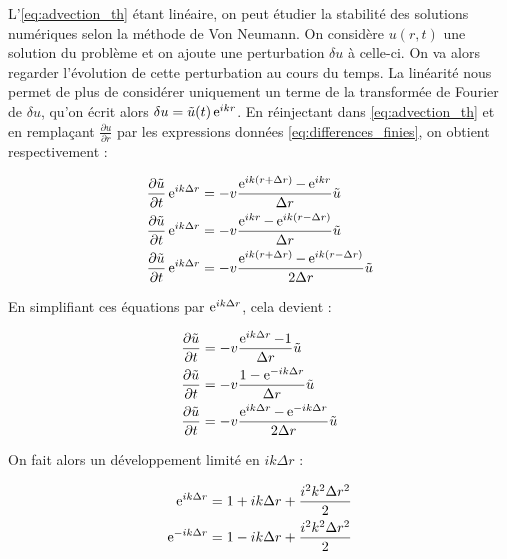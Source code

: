 L’\cref{eq:advection_th} étant linéaire, on peut étudier la stabilité des
solutions numériques selon la méthode de Von Neumann. On considère $u(r,t)$ une
solution du problème et on ajoute une perturbation $\delta{u}$ à celle-ci. On
va alors regarder l’évolution de cette perturbation au cours du temps. La
linéarité nous permet de plus de considérer uniquement un terme de la
transformée de Fourier de $\delta{u}$, qu’on écrit alors $\delta{u} =
\tilde{u}(t) \operatorname{e}^{ikr}$. En réinjectant dans \eqref{eq:advection_th} et en
remplaçant $\frac{\partial u}{\partial r}$ par les expressions données
\cref{eq:differences_finies}, on obtient respectivement :

\begin{subequations}
    \begin{align}
        \frac{\partial \tilde{u}}{\partial t} \operatorname{e}^{ik\Delta{r}} &= - v \frac{\operatorname{e}^{ik(r+\Delta{r})} - \operatorname{e}^{ik r           }}{  \Delta{r}} \tilde{u}\\
        \frac{\partial \tilde{u}}{\partial t} \operatorname{e}^{ik\Delta{r}} &= - v \frac{\operatorname{e}^{ik r           } - \operatorname{e}^{ik(r-\Delta{r})}}{  \Delta{r}} \tilde{u}\\
        \frac{\partial \tilde{u}}{\partial t} \operatorname{e}^{ik\Delta{r}} &= - v \frac{\operatorname{e}^{ik(r+\Delta{r})} - \operatorname{e}^{ik(r-\Delta{r})}}{2 \Delta{r}} \tilde{u}
    \end{align}
\end{subequations}

En simplifiant ces équations par $\operatorname{e}^{ik\Delta{r}}$, cela devient :

\begin{subequations}
    \begin{align}
        \frac{\partial \tilde{u}}{\partial t} &= - v \frac{\operatorname{e}^{ik\Delta{r}} - 1                }{  \Delta{r}} \tilde{u}\\
        \frac{\partial \tilde{u}}{\partial t} &= - v \frac{1                - \operatorname{e}^{-ik\Delta{r}}}{  \Delta{r}} \tilde{u}\\
        \frac{\partial \tilde{u}}{\partial t} &= - v \frac{\operatorname{e}^{ik\Delta{r}} - \operatorname{e}^{-ik\Delta{r}}}{2 \Delta{r}} \tilde{u}
    \end{align}
\end{subequations}

On fait alors un développement limité en $ik\Delta{r}$ :

\begin{align}
    \operatorname{e}^{ ik\Delta{r}} &= 1 + ik\Delta{r} + \frac{i^2 k^2 \Delta{r}^2}{2}\\
    \operatorname{e}^{-ik\Delta{r}} &= 1 - ik\Delta{r} + \frac{i^2 k^2 \Delta{r}^2}{2}
\end{align}

